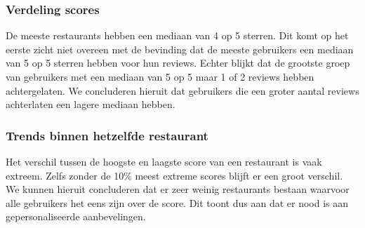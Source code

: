 \subsubsection{Verdeling scores}
De meeste restaurants hebben een mediaan van 4 op 5 sterren. Dit komt op het eerste zicht niet overeen met de bevinding dat de meeste gebruikers een mediaan van 5 op 5 sterren hebben voor hun reviews. Echter blijkt dat de grootste groep van gebruikers met een mediaan van 5 op 5 maar 1 of 2 reviews hebben achtergelaten. We concluderen hieruit dat gebruikers die een groter aantal reviews achterlaten een lagere mediaan hebben.

\subsubsection{Trends binnen hetzelfde restaurant}
Het verschil tussen de hoogste en laagste score van een restaurant is vaak extreem. Zelfs zonder de 10\% meest extreme scores blijft er een groot verschil. We kunnen hieruit concluderen dat er zeer weinig restaurants bestaan waarvoor alle gebruikers het eens zijn over de score. Dit toont dus aan dat er nood is aan gepersonaliseerde aanbevelingen.
